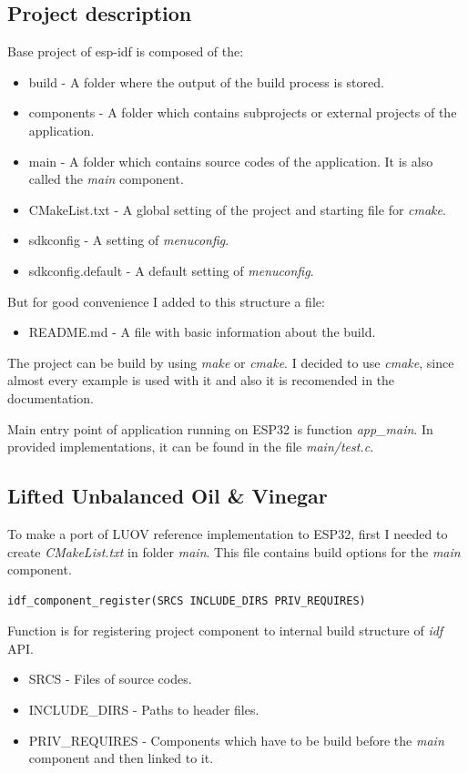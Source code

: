 \documentclass[thesis=M,english]{FITthesis}[2019/12/23]
\begin{document}
\subsection{Project description}
Base project of esp-idf is composed of the:
\begin{itemize}
\item	build - A folder where the output of the build process is stored.
\item	components - A folder which contains subprojects or external projects of the application.
\item	main - A folder which contains source codes of the application. It is also called the \textit{main} component.
\item	CMakeList.txt - A global setting of the project and starting file for \textit{cmake}.
\item	sdkconfig - A setting of \textit{menuconfig}.
\item	sdkconfig.default - A default setting of \textit{menuconfig}.
\end{itemize}
But for good convenience I added to this structure a file:
\begin{itemize}
\item	README.md - A file with basic information about the build.
\end{itemize}

\noindent
The project can be build by using \textit{make} or \textit{cmake}. I decided to use \textit{cmake}, since almost every example is used with it and also it is recomended in the documentation.

\bigskip
\noindent
Main entry point of application running on ESP32 is function \textit{app\_main}. In provided implementations, it can be found in the file \textit{main/test.c}.

\subsection{Lifted Unbalanced Oil \& Vinegar} \label{esp-luov-make}
To make a port of LUOV reference implementation to ESP32, first I needed to create \textit{CMakeList.txt} in folder \textit{main}. This file contains build options for the \textit{main} component.
\begin{lstlisting}[frame=single]
idf_component_register(SRCS INCLUDE_DIRS PRIV_REQUIRES)
\end{lstlisting}
Function is for registering project component to internal build structure of \textit{idf} API.
\begin{itemize}
\item	SRCS - Files of source codes.
\item	INCLUDE\_DIRS - Paths to header files.
\item	PRIV\_REQUIRES - Components which have to be build before the \textit{main} component and then linked to it.
\end{itemize}
\end{document}
